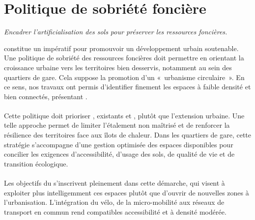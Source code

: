 \documentclass[../main.tex]{subfiles}
\begin{document}
    \newpage

    \vspace{15pt}
\section{Politique de sobriété foncière}

\begin{block}[Maîtriser]
    \linespread{0.9}\selectfont %
    \textit{\small{Encadrer l'artificialisation des sols pour préserver les ressources foncières.}}
\end{block}

    \begin{multicols}{2}
        \raggedcolumns
    \small{
 constitue un impératif pour promouvoir un développement urbain soutenable. Une politique de sobriété des ressources foncières doit permettre  en orientant la croissance urbaine vers les territoires bien desservis, notamment au sein des quartiers de gare. Cela suppose la promotion d’un «~urbanisme circulaire~». En ce sens, nos travaux ont permis d’identifier finement les espaces à faible densité et bien connectés, présentant .
    \\\\
Cette politique doit prioriser ,  existants et , plutôt que l’extension urbaine. Une telle approche permet de limiter l’étalement non maîtrisé et de renforcer la résilience des territoires face aux îlots de chaleur. Dans les quartiers de gare, cette stratégie s’accompagne d’une gestion optimisée des espaces disponibles pour concilier les exigences d'accessibilité, d'usage des sols, de qualité de vie et de transition écologique.
    \\\\
Les objectifs du  s'inscrivent pleinement dans cette démarche, qui visent à exploiter plus intelligemment ces espaces plutôt que d'ouvrir de nouvelles zones à l'urbanisation. L’intégration du vélo, de la micro-mobilité aux réseaux de transport en commun rend compatibles accessibilité et  à densité modérée.
    }

\end{multicols}
\end{document}
